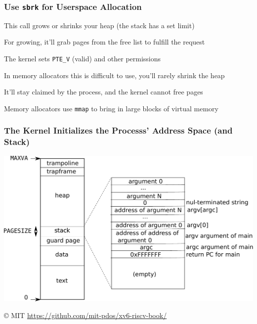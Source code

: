   \begin{frame}
    \frametitle{Use \texttt{sbrk} for Userspace Allocation}

    This call grows or shrinks your heap (the stack has a set limit)

    \vspace{2em}

    For growing, it'll grab pages from the free list to fulfill the request

    \hspace{2em} The kernel sets \texttt{PTE\_V} (valid) and other permissions

    \vspace{2em}

    In memory allocators this is difficult to use, you'll rarely shrink the heap

    \hspace{2em} It'll stay claimed by the process, and the kernel cannot free
    pages

    \vspace{2em}

    Memory allocators use \texttt{mmap} to bring in large blocks of virtual
    memory
  \end{frame}

  \begin{frame}
    \frametitle{The Kernel Initializes the Processs' Address Space (and Stack)}

    \begin{center}
      \includegraphics[scale=0.35]{processlayout.pdf}
    \end{center}

    © MIT \url{https://github.com/mit-pdos/xv6-riscv-book/}
  \end{frame}

